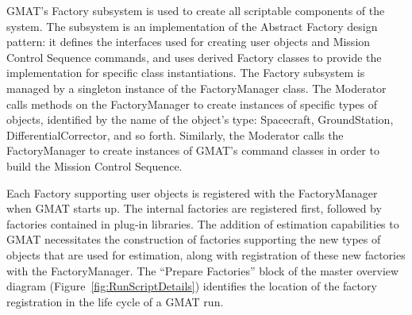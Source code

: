 GMAT's Factory subsystem is used to create all scriptable components of the system.  The subsystem
is an implementation of the Abstract Factory design pattern: it defines the interfaces used for
creating user objects and Mission Control Sequence commands, and uses derived Factory classes to
provide the implementation for specific class instantiations.  The Factory subsystem is managed by a
singleton instance of the FactoryManager class.  The Moderator calls methods on the FactoryManager
to create instances of specific types of objects, identified by the name of the object's type:
Spacecraft, GroundStation, DifferentialCorrector, and so forth.  Similarly, the Moderator calls the
FactoryManager to create instances of GMAT's command classes in order to build the Mission Control
Sequence.

Each Factory supporting user objects is registered with the FactoryManager when GMAT starts up.  The
internal factories are registered first, followed by factories contained in plug-in libraries.  The
addition of estimation capabilities to GMAT necessitates the construction of factories supporting
the new types of objects that are used for estimation, along with registration of these new
factories with the FactoryManager.  The ``Prepare Factories'' block of the master overview diagram
(Figure~\ref{fig:RunScriptDetails}) identifies the location of the factory registration in the life
cycle of a GMAT run.


